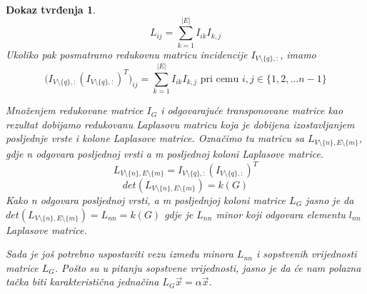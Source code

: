\documentclass[11pt]{article}
\newtheorem*{custom_proof}{Dokaz tvrđenja}
\begin{document}
\begin{custom_proof}
		\[
			L_{ij} = \sum_{k=1}^{|E|} I_{ik}I_{k,j}
		\]
		Ukoliko pak posmatramo redukovnu matricu incidencije $I_{V \setminus \{q\},:}$, imamo
		\[
		\big(I_{V \setminus \{q\},:}(I_{V \setminus \{q\},:})^T\big)_{ij} = \sum_{k=1}^{|E|} I_{ik}I_{k,j} \text{ pri cemu } i,j \in \{1,2, \dots n-1\}
		\]

		Množenjem redukovane matrice $I_G$ i odgovarajuće transponovane matrice kao rezultat dobijamo redukovanu Laplasovu matricu koja je dobijena izostavljanjem posljednje vrste i kolone Laplasove matrice.
		Označimo tu matricu sa $L_{V \setminus \{n\}, E \setminus \{m\}}$, gdje n odgovara posljednoj vrsti a m posljednoj koloni Laplasove matrice.
		\[
			L_{V \setminus \{n\}, E \setminus \{m\}} = I_{V \setminus \{q\},:}(I_{V \setminus \{q\},:})^T
		\]
		\[
			det(L_{V \setminus \{n\}, E \setminus \{m\}}) = k(G)
		\]
		Kako n odgovara posljednoj vrsti, a m posljednjoj koloni matrice $L_G$ jasno je da \\ $det(L_{V \setminus \{n\}, E \setminus \{m\}}) = L_{nn} = k(G)$ gdje je $L_{nn}$ minor koji odgovara elementu $l_{nn}$ Laplasove matrice.
	
	 	Sada je još potrebno uspostaviti vezu između minora $L_{nn}$ i sopstvenih vrijednosti matrice $L_G$.
		Pošto su u pitanju sopstvene vrijednosti, jasno je da će nam polazna tačka biti karakteristična jednačina $L_G \vec{x} = \alpha \vec{x}$.


\end{custom_proof}
\end{document}
